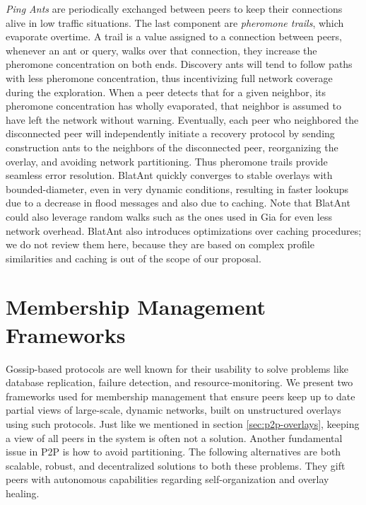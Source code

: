\documentclass[runningheads]{llncs}
\begin{document}
\textit{Ping Ants} are periodically exchanged between peers to keep their connections alive in low traffic situations. The last component are \textit{pheromone trails}, which evaporate overtime. A trail is a value assigned to a connection between peers, whenever an ant or query, walks over that connection, they increase the pheromone concentration on both ends. Discovery ants will tend to follow paths with less pheromone concentration, thus incentivizing full network coverage during the exploration. When a peer detects that for a given neighbor, its pheromone concentration has wholly evaporated, that neighbor is assumed to have left the network without warning. Eventually, each peer who neighbored the disconnected peer will independently initiate a recovery protocol by sending construction ants to the neighbors of the disconnected peer, reorganizing the overlay, and avoiding network partitioning. Thus pheromone trails provide seamless error resolution. BlatAnt quickly converges to stable overlays with bounded-diameter, even in very dynamic conditions, resulting in faster lookups due to a decrease in flood messages and also due to caching. Note that BlatAnt could also leverage random walks such as the ones used in Gia for even less network overhead. BlatAnt also introduces optimizations over caching procedures; we do not review them here, because they are based on complex profile similarities and caching is out of the scope of our proposal.

\newpage\section{Membership Management Frameworks}\label{sec:membership-management}
Gossip-based protocols are well known for their usability to solve problems like database replication, failure detection, and resource-monitoring. We present two frameworks used for membership management that ensure peers keep up to date partial views of large-scale, dynamic networks, built on unstructured overlays using such protocols. Just like we mentioned in section \ref{sec:p2p-overlays}, keeping a view of all peers in the system is often not a solution. Another fundamental issue in P2P is how to avoid partitioning. The following alternatives are both scalable, robust, and decentralized solutions to both these problems. They gift peers with autonomous capabilities regarding self-organization and overlay healing.
\end{document}
